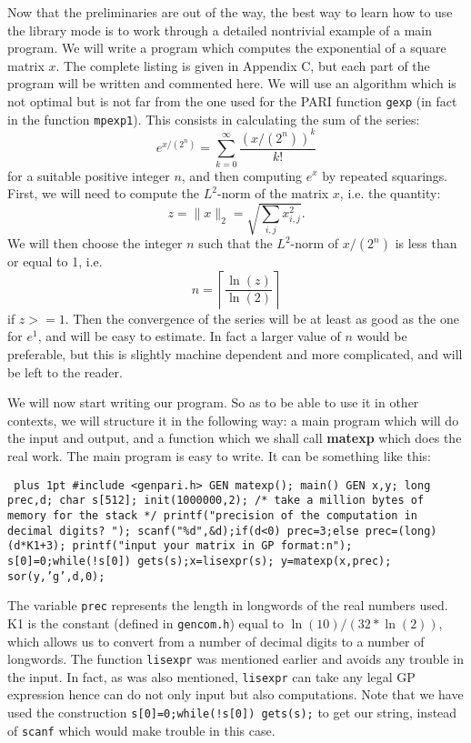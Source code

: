 Now that the preliminaries are out of the way, the best way to learn how to use
the library mode is to work through a detailed nontrivial example of a main
program. We will write a program which computes the exponential of a square matrix $x$.
The complete listing is given in Appendix C, but each part of the
program will be written and commented here. We will use an algorithm which is not
optimal but is not far from the one used for the PARI function {\tt gexp} (in fact
in the function {\tt mpexp1}). This consists in calculating the sum of the series:
$$e^{x/(2^n)}=\sum_{k=0}^\infty \dfrac{(x/(2^n))^k}{k!}$$
for a suitable positive integer $n$, and then computing $e^x$ by repeated squarings.
First, we will need to compute the $L^2$-norm of the matrix $x$, i.e. the quantity:
$$z=\|x\|_2=\sqrt{\sum_{i,j}x_{i,j}^2}.$$
We will then choose the integer $n$ such that the $L^2$-norm of $x/(2^n)$ is less than
or equal to 1, i.e. $$n=\left\lceil\dfrac{\ln(z)}{\ln(2)}\right\rceil$$ if $z>=1$. Then the
convergence of the series will be at least as good as the one for $e^1$,
and will be easy to estimate. In fact a larger value of $n$ would be preferable,
but this is slightly machine dependent and more complicated, and will be left
to the reader.

We will now start writing our program. So as to be able to use it in other
contexts, we will structure it in the following way: a main program which
will do the input and output, and a function which we shall call {\bf matexp}
which does the real work. The main program is easy to write. It can be
something like this:

{\tt \obeylines\parskip=0pt plus 1pt
\hbox{}
\#include <genpari.h>
GEN matexp();
\hbox{}
main()
\obr
\quad GEN x,y;
\quad long prec,d;
\quad char s[512];
\hbox{}
\quad init(1000000,2); /* take a million bytes of memory for the stack */
\quad printf("precision of the computation in decimal digits? ");
\quad scanf("\%d",\&d);if(d<0) prec=3;else prec=(long)(d*K1+3);
\quad printf("input your matrix in GP format:\bs n");
\quad s[0]=0;while(!s[0]) gets(s);x=lisexpr(s);
\quad y=matexp(x,prec);
\quad sor(y,'g',d,0);
\cbr 
}

The variable {\tt prec} represents the length in longwords of the
real numbers used. K1 is the constant (defined in {\tt gencom.h}) equal to
$\ln(10)/(32*\ln(2))$, which allows us to convert from a number of decimal digits
to a number of longwords. The function {\tt lisexpr} was mentioned earlier and
avoids any trouble in the input. In fact, as was also mentioned, {\tt lisexpr}
can take any legal GP expression hence can do not only input but also
computations. Note that we have used the construction {\tt s[0]=0;while(!s[0]) gets(s);}
to get our string, instead of {\tt scanf} which would make trouble in this case.


